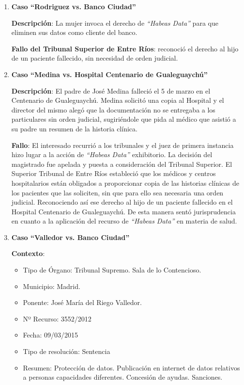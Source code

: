     \begin{enumerate}
        \item \textbf{Caso ``Rodriguez vs. Banco Ciudad''}
        
            \textbf{Descripción}:
            La mujer invoca el derecho de \textit{``Habeas Data''} para que eliminen sus datos como cliente del banco.
        
            \textbf{Fallo del Tribunal Superior de Entre Ríos}:
            reconoció el derecho al hijo de un paciente fallecido, sin necesidad de orden judicial.
            
        \item \textbf{Caso ``Medina vs. Hospital Centenario de Gualeguaychú''}
            
            \textbf{Descripción}:
            El padre de José Medina falleció el 5 de marzo en el Centenario de Gualeguaychú.
            Medina solicitó una copia al Hospital y el director del mismo alegó que la documentación no se entregaba a los particulares sin orden judicial, sugiriéndole que pida al médico que asistió a su padre un resumen de la historia clínica.
            
            \textbf{Fallo}:
            El interesado recurrió a los tribunales y el juez de primera instancia hizo lugar a la acción de \textit{``Habeas Data''} exhibitorio.
            La decisión del magistrado fue apelada y puesta a consideración del Tribunal Superior.
            El Superior Tribunal de Entre Ríos estableció que los médicos y centros hospitalarios están obligados a proporcionar copia de las historias clínicas de los pacientes que las soliciten, sin que para ello sea necesaria una orden judicial.
            Reconociendo así ese derecho al hijo de un paciente fallecido en el Hospital Centenario de Gualeguaychú.
            De esta manera sentó jurisprudencia en cuanto a la aplicación del recurso de \textit{``Habeas Data''} en materia de salud.
        
        \item \textbf{Caso ``Valledor vs. Banco Ciudad''}
        
            \textbf{Contexto}:
            
            \begin{itemize}
                \item Tipo de Órgano: Tribunal Supremo. Sala de lo Contencioso.
                \item Municipio: Madrid.
                \item Ponente: José María del Riego Valledor.
                \item Nº Recurso: 3552/2012
                \item Fecha: 09/03/2015
                \item Tipo de resolución: Sentencia
                \item Resumen: Protección de datos. Publicación en internet de datos relativos a personas capacidades diferentes. Concesión de ayudas. Sanciones.
            \end{itemize}
            

\end{enumerate}
